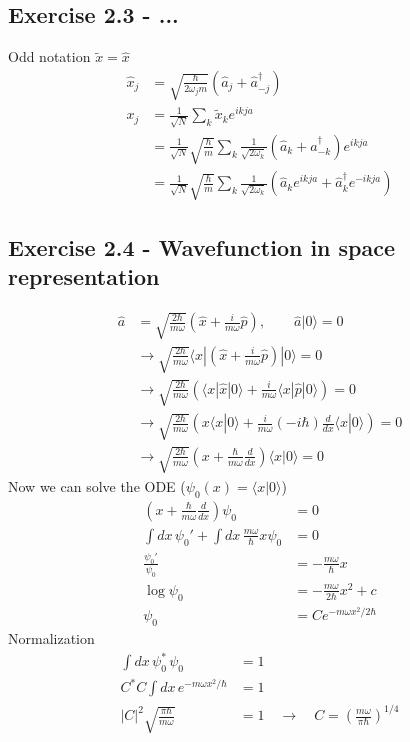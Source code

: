 \documentclass[../main.tex]{subfiles}
\begin{document}
\subsection*{Exercise 2.3 - ...}
Odd notation $\tilde{x}=\hat{x}$
\begin{align}
\hat{x}_j&=\sqrt{\frac{\hbar}{2\omega_j m}}(\hat{a}_j+\hat{a}_{-j}^\dagger)\\
x_j
&=\frac{1}{\sqrt{N}}\sum_k\tilde{x}_ke^{ikja}\\
&=\frac{1}{\sqrt{N}}\sqrt{\frac{\hbar}{m}}\sum_k\frac{1}{\sqrt{2\omega_k}}(\hat{a}_k+\hat{a}_{-k}^\dagger)e^{ikja}\\
&=\frac{1}{\sqrt{N}}\sqrt{\frac{\hbar}{m}}\sum_k\frac{1}{\sqrt{2\omega_k}}(\hat{a}_k e^{ikja}+\hat{a}_{k}^\dagger e^{-ikja})
\end{align}


\subsection*{Exercise 2.4 - Wavefunction in space representation}
\begin{align}
\hat{a}&=\sqrt{\frac{2\hbar}{m\omega}}\left(\hat{x}+\frac{i}{m\omega}\hat{p}\right), \qquad \hat{a}|0\rangle=0\\
&\rightarrow\sqrt{\frac{2\hbar}{m\omega}}\langle x|\left(\hat{x}+\frac{i}{m\omega}\hat{p}\right)|0\rangle=0\\
&\rightarrow\sqrt{\frac{2\hbar}{m\omega}}\left(\langle x|\hat{x}|0\rangle+\frac{i}{m\omega}\langle x|\hat{p}|0\rangle\right)=0\\
&\rightarrow\sqrt{\frac{2\hbar}{m\omega}}\left(x\langle x|0\rangle+\frac{i}{m\omega}(-i\hbar)\frac{d}{dx}\langle x|0\rangle\right)=0\\
&\rightarrow\sqrt{\frac{2\hbar}{m\omega}}\left(x+\frac{\hbar}{m\omega}\frac{d}{dx}\right)\langle x|0\rangle=0
\end{align}
Now we can solve the ODE ($\psi_0(x)=\langle x|0\rangle$)
\begin{align}
\left(x+\frac{\hbar}{m\omega}\frac{d}{dx}\right)\psi_0&=0\\
\int dx\,\psi_0'+\int dx\,\frac{m\omega}{\hbar} x\psi_0&=0\\
\frac{\psi_0'}{\psi_0}&=-\frac{m\omega}{\hbar}x\\
\log\psi_0&=-\frac{m\omega}{2\hbar}x^2+c\\
\psi_0&=Ce^{-m\omega x^2/2\hbar}
\end{align}
Normalization
\begin{align}
\int dx\,\psi_0^*\,\psi_0&=1\\
C^*C\int dx\,e^{-m\omega x^2/\hbar}&=1\\
|C|^2\sqrt{\frac{\pi\hbar}{m\omega}}&=1\quad\rightarrow\quad C=\left(\frac{m\omega}{\pi\hbar}\right)^{1/4}
\end{align}
\end{document}
